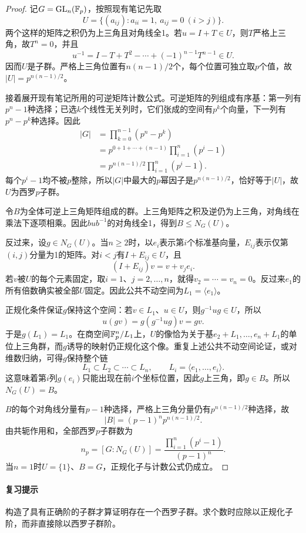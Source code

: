 \begin{proof}
记$G=\operatorname{GL}_n(\mathbb F_p)$，按照现有笔记先取
\[
U=\{(a_{ij}):a_{ii}=1,\ a_{ij}=0\ (i>j)\}.
\]
两个这样的矩阵之积仍为上三角且对角线全1。若$u=I+T\in U$，则$T$严格上三角，故$T^n=0$，并且
\[
u^{-1}=I-T+T^2-\cdots+(-1)^{n-1}T^{n-1}\in U.
\]
因而$U$是子群。严格上三角位置有$n(n-1)/2$个，每个位置可独立取$p$个值，故$|U|=p^{n(n-1)/2}$。

接着展开现有笔记所用的可逆矩阵计数公式。可逆矩阵的列组成有序基：第一列有$p^n-1$种选择；已选$k$个线性无关列时，它们张成的空间有$p^k$个向量，下一列有$p^n-p^k$种选择。因此
\begin{align*}
|G|&=\prod_{k=0}^{n-1}(p^n-p^k)\\
&=p^{0+1+\cdots+(n-1)}\prod_{i=1}^n(p^i-1)\\
&=p^{n(n-1)/2}\prod_{i=1}^n(p^i-1).
\end{align*}
每个$p^i-1$均不被$p$整除，所以$|G|$中最大的$p$幂因子是$p^{n(n-1)/2}$，恰好等于$|U|$，故$U$为西罗$p$子群。

令$B$为全体可逆上三角矩阵组成的群。上三角矩阵之积及逆仍为上三角，对角线在乘法下逐项相乘。因此$bub^{-1}$的对角线全1，得到$B\le N_G(U)$。

反过来，设$g\in N_G(U)$。当$n\ge2$时，以$e_i$表示第$i$个标准基向量，$E_{ij}$表示仅第$(i,j)$分量为1的矩阵。对$i<j$有$I+E_{ij}\in U$，且
\[
(I+E_{ij})v=v+v_je_i.
\]
若$v$被$U$的每个元素固定，取$i=1$、$j=2,\ldots,n$，就得$v_2=\cdots=v_n=0$。反过来$e_1$的所有倍数确实被全部$U$固定。因此公共不动空间为$L_1=\langle e_1\rangle$。

正规化条件保证$g$保持这个空间：若$v\in L_1$、$u\in U$，则$g^{-1}ug\in U$，所以
\[
u(gv)=g(g^{-1}ug)v=gv.
\]
于是$g(L_1)=L_1$。在商空间$\mathbb F_p^n/L_1$上，$U$的像恰为关于基$e_2+L_1,\ldots,e_n+L_1$的单位上三角群，而$g$诱导的映射仍正规化这个像。重复上述公共不动空间论证，或对维数归纳，可得$g$保持整个链
\[
L_1\subset L_2\subset\cdots\subset L_n,
\qquad L_i=\langle e_1,\ldots,e_i\rangle.
\]
这意味着第$i$列$g(e_i)$只能出现在前$i$个坐标位置，因此$g$上三角，即$g\in B$。所以$N_G(U)=B$。

$B$的每个对角线分量有$p-1$种选择，严格上三角分量仍有$p^{n(n-1)/2}$种选择，故
\[
|B|=(p-1)^np^{n(n-1)/2}.
\]
由共轭作用和，全部西罗$p$子群数为
\[
n_p=[G:N_G(U)]
=\frac{\prod_{i=1}^n(p^i-1)}{(p-1)^n}.
\]
当$n=1$时$U=\{1\}$、$B=G$，正规化子与计数公式仍成立。
\end{proof}

\paragraph{复习提示}
构造了具有正确阶的子群才算证明存在一个西罗子群。求个数时应除以正规化子阶，而非直接除以西罗子群阶。


